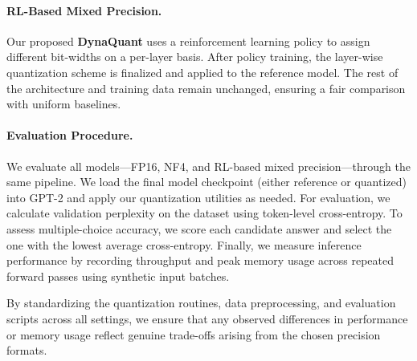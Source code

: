 \documentclass{article}
\begin{document}
	\paragraph{RL-Based Mixed Precision.}
	Our proposed \textbf{DynaQuant} uses a reinforcement learning policy to assign different bit-widths on a per-layer basis. After policy training, the layer-wise quantization scheme is finalized and applied to the reference model. The rest of the architecture and training data remain unchanged, ensuring a fair comparison with uniform baselines.
	
	\paragraph{Evaluation Procedure.}
	We evaluate all models---FP16, NF4, and RL-based mixed precision---through the same pipeline. We load the final model checkpoint (either reference or quantized) into GPT-2 and apply our quantization utilities as needed. For evaluation, we calculate validation perplexity on the dataset using token-level cross-entropy. To assess multiple-choice accuracy, we score each candidate answer and select the one with the lowest average cross-entropy. Finally, we measure inference performance by recording throughput and peak memory usage across repeated forward passes using synthetic input batches.
	
	By standardizing the quantization routines, data preprocessing, and evaluation scripts across all settings, we ensure that any observed differences in performance or memory usage reflect genuine trade-offs arising from the chosen precision formats.
	
\end{document}
